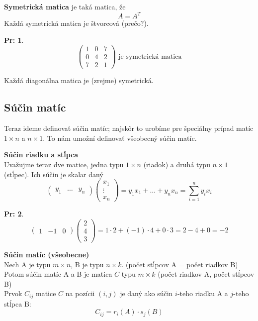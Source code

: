 \documentclass[12pt, a4paper]{article}
\theoremstyle{definition}
\newtheorem*{example}{Pr:}
\begin{document}
\textbf{Symetrická matica} je taká matica, že
\[ A = A^T \]
Každá symetrická matica je štvorcová (prečo?). \\
\begin{example}
\[ \begin{pmatrix} 1 & 0 & 7 \\ 0 & 4 & 2 \\ 7 & 2 & 1 \end{pmatrix} \text{ je symetrická matica} \]
\end{example}
Každá diagonálna matica je (zrejme) symetrická.

\subsection*{Súčin matíc}
Teraz ideme definovať súčin matíc; najskôr to urobíme pre špeciálny prípad matíc $1 \times n$ a $n \times 1$.
To nám umožní definovať všeobecný súčin matíc.

\textbf{Súčin riadku a stĺpca} \\
Uvažujme teraz dve matice, jedna typu $1 \times n$ (riadok) a druhá typu $n \times 1$ (stĺpec). Ich súčin je skalar daný
\[ \begin{pmatrix} y_1 & \dots & y_n \end{pmatrix} \begin{pmatrix} x_1 \\ \vdots \\ x_n \end{pmatrix} = y_1 x_1 + \dots + y_n x_n = \sum_{i=1}^n y_i x_i \]
\begin{example}
\[ \begin{pmatrix} 1 & -1 & 0 \end{pmatrix} \begin{pmatrix} 2 \\ 4 \\ 3 \end{pmatrix} = 1 \cdot 2 + (-1) \cdot 4 + 0 \cdot 3 = 2 - 4 + 0 = -2 \]
\end{example}

\textbf{Súčin matíc (všeobecne)} \\
Nech A je typu $m \times n$, B je typu $n \times k$. (počet stĺpcov A = počet riadkov B) \\
Potom súčin matíc A a B je matica $C$ typu $m \times k$ (počet riadkov A, počet stĺpcov B) \\
Prvok $C_{ij}$ matice $C$ na pozícii $(i, j)$ je daný ako súčin $i$-teho riadku A a $j$-teho stĺpca B:
\[ C_{ij} = r_i(A) \cdot s_j(B) \]
\end{document}
